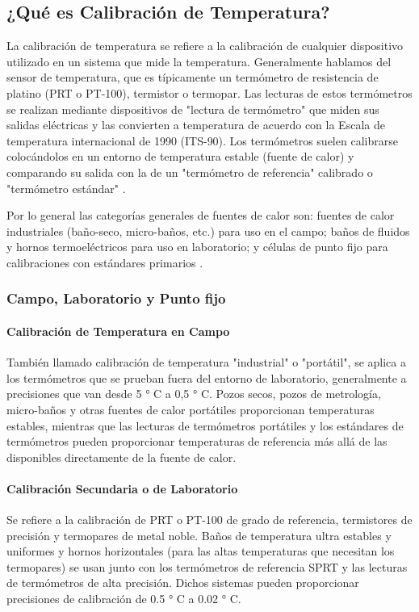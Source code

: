 \subsection{¿Qué es Calibración de Temperatura?}

\par 
La calibración de temperatura se refiere a la calibración de cualquier dispositivo utilizado en un sistema que mide la temperatura. Generalmente hablamos del sensor de temperatura, que es típicamente un termómetro de resistencia de platino (PRT o PT-100), termistor o termopar. Las lecturas de estos termómetros se realizan mediante dispositivos de "lectura de termómetro" que miden sus salidas eléctricas y las convierten a temperatura de acuerdo con la Escala de temperatura internacional de 1990 (ITS-90).
Los termómetros suelen calibrarse colocándolos en un entorno de temperatura estable (fuente de calor) y comparando su salida con la de un "termómetro de referencia" calibrado o "termómetro estándar" \cite{temperatura-fluke}. 

\par \noindent
Por lo general las categorías generales de fuentes de calor son: fuentes de calor industriales (baño-seco, micro-baños, etc.) para uso en el campo; baños de fluidos y hornos termoeléctricos para uso en laboratorio; y células de punto fijo para calibraciones con estándares primarios \cite{temperatura-fluke}.

\subsubsection{Campo, Laboratorio y Punto fijo \cite{temperatura-fluke}}

\paragraph{Calibración de Temperatura en Campo}
También llamado calibración de temperatura "industrial" o "portátil", se aplica a los termómetros que se prueban fuera del entorno de laboratorio, generalmente a precisiones que van desde 5 ° C a 0,5 ° C. Pozos secos, pozos de metrología, micro-baños y otras fuentes de calor portátiles proporcionan temperaturas estables, mientras que las lecturas de termómetros portátiles y los estándares de termómetros pueden proporcionar temperaturas de referencia más allá de las disponibles directamente de la fuente de calor.

\paragraph{Calibración Secundaria o de Laboratorio}
Se refiere a la calibración de PRT o PT-100 de grado de referencia, termistores de precisión y termopares de metal noble. Baños de temperatura ultra estables y uniformes y hornos horizontales (para las altas temperaturas que necesitan los termopares) se usan junto con los termómetros de referencia SPRT y las lecturas de termómetros de alta precisión. Dichos sistemas pueden proporcionar precisiones de calibración de 0.5 ° C a 0.02 ° C.

